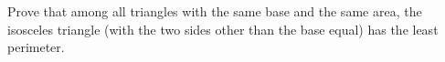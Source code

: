Prove that among all triangles with the same base and the same area, the isosceles triangle (with the two sides other than the base equal) has the least perimeter.
